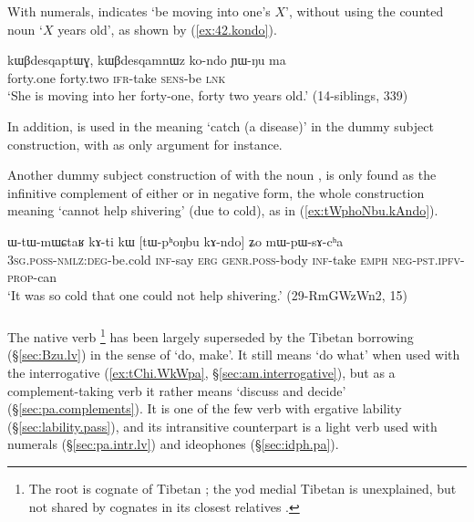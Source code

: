 With numerals,  indicates `be moving into one's $X$', without using the counted noun  `$X$ years old', as shown by (\ref{ex:42.kondo}).

\begin{exe}
\ex \label{ex:42.kondo}
\gll  kɯβdesqaptɯɣ, kɯβdesqamnɯz ko-ndo ɲɯ-ŋu ma \\
forty.one forty.two \textsc{ifr}-take \textsc{sens}-be \textsc{lnk} \\ 
\glt `She is moving into her forty-one, forty two years old.' (14-siblings, 339)
 \end{exe}
  
In addition,  is used in the meaning `catch (a disease)' in the dummy subject construction, with  as only argument for instance.
 
Another dummy subject construction of  with  the noun ,  is only found as the infinitive complement of either  or  in negative form, the whole construction meaning `cannot help shivering' (due to cold), as in (\ref{ex:tWphoNbu.kAndo}). 

\begin{exe}
\ex \label{ex:tWphoNbu.kAndo}
\gll  ɯ-tɯ-mɯɕtaʁ kɤ-ti kɯ [tɯ-pʰoŋbu kɤ-ndo] ʑo mɯ-pɯ-sɤ-cʰa \\
\textsc{3sg}.\textsc{poss}-\textsc{nmlz}:\textsc{deg}-be.cold \textsc{inf}-say \textsc{erg} \textsc{genr}.\textsc{poss}-body \textsc{inf}-take \textsc{emph} \textsc{neg}-\textsc{pst}.\textsc{ipfv}-\textsc{prop}-can \\
\glt `It was so cold that one could not help shivering.' (29-RmGWzWn2, 15)
\end{exe} 

 \subsubsection{ } \label{sec:pa.lv}
The native verb \footnote{The root  is cognate of Tibetan ; the yod medial Tibetan is unexplained, but not shared by cognates in its closest relatives \citep{jacques13yod}. } has been largely superseded by the Tibetan borrowing  (§\ref{sec:Bzu.lv}) in the sense of `do, make'. It still means `do what' when used with the interrogative  (\ref{ex:tChi.WkWpa}, §\ref{sec:am.interrogative}), but as a complement-taking verb it rather means `discuss and decide' (§\ref{sec:pa.complements}). It is one of the few verb with ergative lability (§\ref{sec:lability.pass}), and its intransitive counterpart is a light verb used with numerals (§\ref{sec:pa.intr.lv}) and ideophones (§\ref{sec:idph.pa}).

